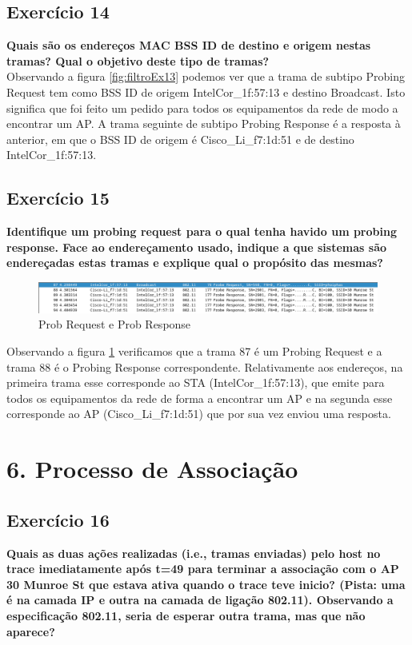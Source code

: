 \documentclass[a4paper]{report}
\begin{document}
\section{Exercício 14}
\textbf{Quais são os endereços MAC BSS ID de destino e origem nestas tramas?
Qual o objetivo deste tipo de tramas?}\\
Observando a figura \ref{fig:filtroEx13} podemos ver que a trama de subtipo Probing 
Request tem como BSS ID de origem IntelCor\_1f:57:13 e destino Broadcast. Isto 
significa que foi feito um pedido para todos os equipamentos da rede de modo a encontrar
um AP. A trama seguinte de subtipo Probing Response é a resposta à anterior, em que o BSS
ID de origem é Cisco\_Li\_f7:1d:51 e de destino IntelCor\_1f:57:13.

\section{Exercício 15}
\textbf{Identifique um probing request para o qual tenha havido um probing
response. Face ao endereçamento usado, indique a que sistemas são
endereçadas estas tramas e explique qual o propósito das mesmas?}

\begin{figure}[H]
    \centering 
    \includegraphics[width=\textwidth]{images/probEx15.png}  
    \caption{Prob Request e Prob Response}
    \label{fig:probEx15}
\end{figure}
Observando a figura \ref{fig:probEx15} verificamos que a trama 87 é um Probing Request e a 
trama 88 é o Probing Response correspondente. Relativamente aos endereços, na primeira 
trama esse corresponde ao STA (IntelCor\_1f:57:13), que emite para todos os equipamentos da
rede de forma a encontrar um AP e na segunda esse corresponde ao AP (Cisco\_Li\_f7:1d:51) que
por sua vez enviou uma resposta.

\chapter{6. Processo de Associação}
\section{Exercício 16}
\textbf{Quais as duas ações realizadas (i.e., tramas enviadas) pelo host no
trace imediatamente após t=49 para terminar a associação com o AP 30 Munroe
St que estava ativa quando o trace teve inicio? (Pista: uma é na camada IP e
outra na camada de ligação 802.11). Observando a especificação 802.11, seria
de esperar outra trama, mas que não aparece?}
\end{document}
